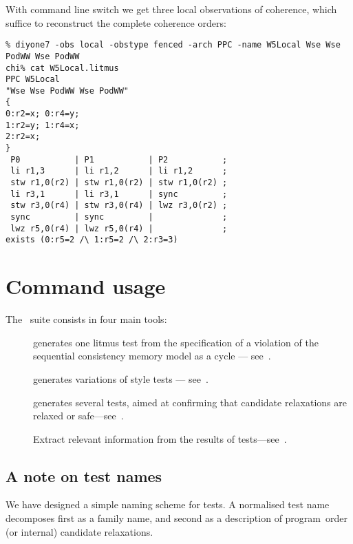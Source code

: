 With command line switch  we get three local observations of coherence,
which suffice to reconstruct the complete coherence orders:
\begin{verbatim}
% diyone7 -obs local -obstype fenced -arch PPC -name W5Local Wse Wse PodWW Wse PodWW
chi% cat W5Local.litmus
PPC W5Local
"Wse Wse PodWW Wse PodWW"
{
0:r2=x; 0:r4=y;
1:r2=y; 1:r4=x;
2:r2=x;
}
 P0           | P1           | P2           ;
 li r1,3      | li r1,2      | li r1,2      ;
 stw r1,0(r2) | stw r1,0(r2) | stw r1,0(r2) ;
 li r3,1      | li r3,1      | sync         ;
 stw r3,0(r4) | stw r3,0(r4) | lwz r3,0(r2) ;
 sync         | sync         |              ;
 lwz r5,0(r4) | lwz r5,0(r4) |              ;
exists (0:r5=2 /\ 1:r5=2 /\ 2:r3=3)
\end{verbatim}

\section{Command usage}

The~\diy{} suite consists in four main tools:
\begin{description}
\item[\diyone] generates one litmus test from the specification
of a violation of the sequential consistency memory model as a cycle
--- see~\mysec{\ref{diyone:intro}}.
\item[\diycross] generates variations of \diyone{} style tests
--- see~\mysec{\ref{diycross:intro}}.
\item[\diy] generates several tests, aimed at confirming
that candidate relaxations are relaxed or safe---see~\mysec{\ref{diy:intro}}.
\item[\readRelax] Extract relevant information from
the results of tests---see~\mysec{\ref{readRelax:intro}}.
\end{description}

\subsection{A note \label{sec:names}\label{naming}on test names}
We have designed a simple naming scheme for tests.
A normalised test name decomposes first as a family name,
and second as a description of program~order (or internal)
candidate relaxations.

